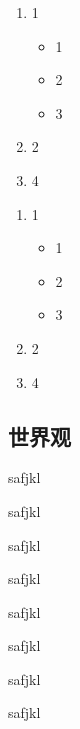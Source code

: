 \begin{multicols}{2}
\begin{enumerate}
	\item 1
	\begin{itemize}
		\item 1
		\item 2
		\item 3
	\end{itemize}	
	\item 2
	\item 4
\end{enumerate}
\columnbreak
{}
\begin{enumerate}
	\item 1
	\begin{itemize}
		\item 1
		\item 2
		\item 3
	\end{itemize}	
	\item 2
	\item 4
\end{enumerate}
\end{multicols}

\subsection{世界观}\label{2-1-3}

\exercises

\begin{exe}
	safjkl
\end{exe}

\begin{exe}
	safjkl
\end{exe}

\begin{exe}
	safjkl
\end{exe}

\begin{exe}
	safjkl
\end{exe}

\answers

\begin{ans}
	safjkl
\end{ans}

\begin{ans}
	safjkl
\end{ans}

\begin{ans}
	safjkl
\end{ans}

\begin{ans}
	safjkl
\end{ans}

\newpage\pagecolor{white}
